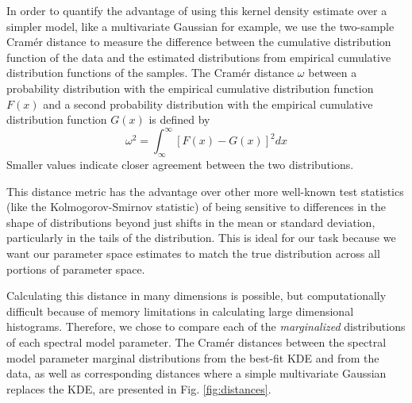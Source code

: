 In order to quantify the advantage of using this kernel density estimate over a simpler model, like a multivariate Gaussian for example, we use the two-sample Cram\'{e}r distance \citep{Cramer1928} to measure the difference between the cumulative distribution function of the data and the estimated distributions from empirical cumulative distribution functions of the samples.
The Cram\'{e}r distance $\omega$ between a probability distribution with the empirical cumulative distribution function $F(x)$ and a second probability distribution with the empirical cumulative distribution function $G(x)$ is defined by
\begin{equation}
    \omega^2 = \displaystyle \int_\infty^\infty [F(x)-G(x)]^2 dx
\end{equation}
Smaller values indicate closer agreement between the two distributions.

This distance metric has the advantage over other more well-known test statistics (like the Kolmogorov-Smirnov statistic) of being sensitive to differences in the shape of distributions beyond just shifts in the mean or standard deviation, particularly in the tails of the distribution. This is ideal for our task because we want our parameter space estimates to match the true distribution across all portions of parameter space.

Calculating this distance in many dimensions is possible, but computationally difficult because of memory limitations in calculating large dimensional histograms. Therefore, we chose to compare each of the \emph{marginalized} distributions of each spectral model parameter. The Cram\'{e}r distances between the spectral model parameter marginal distributions from the best-fit KDE and from the data, as well as corresponding distances where a simple multivariate Gaussian replaces the KDE, are presented in Fig. \ref{fig:distances}.

